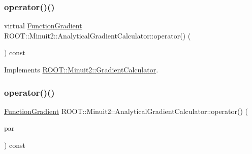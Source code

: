 \mbox{\label{classROOT_1_1Minuit2_1_1AnalyticalGradientCalculator_a711ef74b01726ca7081031998c44d81b}} 
\subsubsection{\texorpdfstring{operator()()}{operator()()}\hspace{0.1cm}{\footnotesize\ttfamily [1/4]}}
{\footnotesize\ttfamily virtual \mbox{\hyperlink{classROOT_1_1Minuit2_1_1FunctionGradient}{Function\+Gradient}} R\+O\+O\+T\+::\+Minuit2\+::\+Analytical\+Gradient\+Calculator\+::operator() (\begin{DoxyParamCaption}\item[{const \mbox{\hyperlink{classROOT_1_1Minuit2_1_1MinimumParameters}{Minimum\+Parameters}} \&}]{ }\end{DoxyParamCaption}) const\hspace{0.3cm}{\ttfamily [virtual]}}



Implements \mbox{\hyperlink{classROOT_1_1Minuit2_1_1GradientCalculator_a1bae913e96ffc9ece28664a5f6f79cb0}{R\+O\+O\+T\+::\+Minuit2\+::\+Gradient\+Calculator}}.

\mbox{\label{classROOT_1_1Minuit2_1_1AnalyticalGradientCalculator_aff4787568d15aaf6dac1c8ffa1bd9db7}} 
\subsubsection{\texorpdfstring{operator()()}{operator()()}\hspace{0.1cm}{\footnotesize\ttfamily [2/4]}}
{\footnotesize\ttfamily \mbox{\hyperlink{classROOT_1_1Minuit2_1_1FunctionGradient}{Function\+Gradient}} R\+O\+O\+T\+::\+Minuit2\+::\+Analytical\+Gradient\+Calculator\+::operator() (\begin{DoxyParamCaption}\item[{const \mbox{\hyperlink{classROOT_1_1Minuit2_1_1MinimumParameters}{Minimum\+Parameters}} \&}]{par }\end{DoxyParamCaption}) const\hspace{0.3cm}{\ttfamily [virtual]}}



